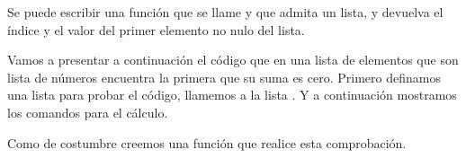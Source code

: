 

Se puede escribir una función que se llame 
y que admita un lista, y devuelva el índice y el valor del
primer elemento no nulo del lista.



Vamos a presentar a continuación el código que en una lista
de elementos que son lista de números encuentra la primera
que su suma es cero.
Primero definamos una lista para probar el código, llamemos a la lista
.
Y a continuación mostramos los comandos para el cálculo.



Como de costumbre creemos una función que realice esta comprobación.


